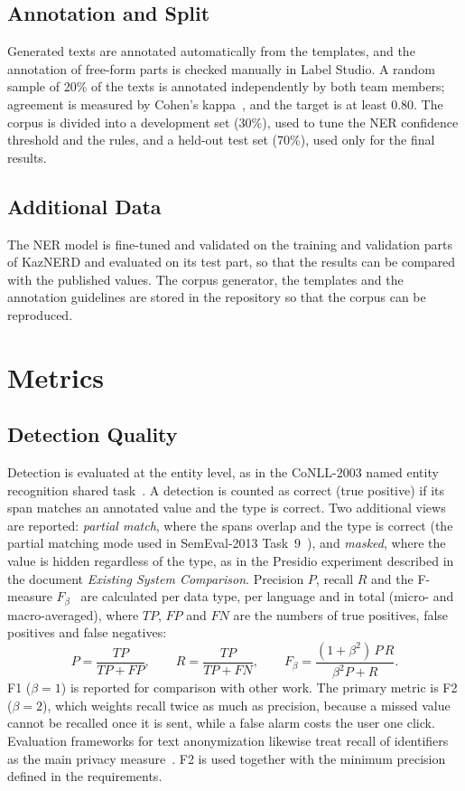 \documentclass[12pt,a4paper]{article}
\begin{document}
\subsection{Annotation and Split}

Generated texts are annotated automatically from the templates, and the annotation of free-form parts is checked manually in Label Studio. A random sample of 20\% of the texts is annotated independently by both team members; agreement is measured by Cohen's kappa~\cite{cohen}, and the target is at least 0.80. The corpus is divided into a development set (30\%), used to tune the NER confidence threshold and the rules, and a held-out test set (70\%), used only for the final results.

\subsection{Additional Data}

The NER model is fine-tuned and validated on the training and validation parts of KazNERD and evaluated on its test part, so that the results can be compared with the published values. The corpus generator, the templates and the annotation guidelines are stored in the repository so that the corpus can be reproduced.

\section{Metrics}

\subsection{Detection Quality}

Detection is evaluated at the entity level, as in the CoNLL-2003 named entity recognition shared task~\cite{conll}. A detection is counted as correct (true positive) if its span matches an annotated value and the type is correct. Two additional views are reported: \emph{partial match}, where the spans overlap and the type is correct (the partial matching mode used in SemEval-2013 Task~9~\cite{semeval}), and \emph{masked}, where the value is hidden regardless of the type, as in the Presidio experiment described in the document \emph{Existing System Comparison}. Precision $P$, recall $R$ and the F-measure $F_\beta$~\cite{rijsbergen} are calculated per data type, per language and in total (micro- and macro-averaged), where $TP$, $FP$ and $FN$ are the numbers of true positives, false positives and false negatives:
\[
P=\frac{TP}{TP+FP},\qquad R=\frac{TP}{TP+FN},\qquad F_\beta=\frac{(1+\beta^2)\,P\,R}{\beta^2 P+R}.
\]
F1 ($\beta=1$) is reported for comparison with other work. The primary metric is F2 ($\beta=2$), which weights recall twice as much as precision, because a missed value cannot be recalled once it is sent, while a false alarm costs the user one click. Evaluation frameworks for text anonymization likewise treat recall of identifiers as the main privacy measure~\cite{tab}. F2 is used together with the minimum precision defined in the requirements.
\end{document}
